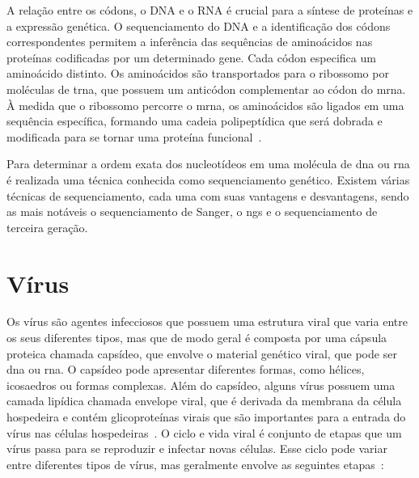 A relação entre os códons, o DNA e o RNA é crucial para a síntese de proteínas e a expressão genética. O sequenciamento do DNA e a identificação dos códons correspondentes permitem a inferência das sequências de aminoácidos nas proteínas codificadas por um determinado gene.
Cada códon especifica um aminoácido distinto. Os aminoácidos são transportados para o ribossomo por moléculas de \gls{trna}, que possuem um anticódon complementar ao códon do \gls{mrna}. À medida que o ribossomo percorre o \gls{mrna}, os aminoácidos são ligados em uma sequência específica, formando uma cadeia polipeptídica que será dobrada e modificada para se tornar uma proteína funcional~\cite{alberts_biologia_2017}.

Para determinar a ordem exata dos nucleotídeos em uma molécula de \gls{dna} ou \gls{rna} é realizada uma técnica conhecida como sequenciamento genético. Existem várias técnicas de sequenciamento, cada uma com suas vantagens e desvantagens, sendo as mais notáveis o sequenciamento de Sanger, o \gls{ngs} e o sequenciamento de terceira geração.~\cite{nanopore_sequence_jain_2016,dna_sequence_sanger_1977,next_generation_sequence_goodwin_2016}

\section{Vírus}

Os vírus são agentes infecciosos que possuem uma estrutura viral que varia entre os seus diferentes tipos, mas que de modo geral é composta por uma cápsula proteica chamada capsídeo, que envolve o material genético viral, que pode ser \gls{dna} ou \gls{rna}. O capsídeo pode apresentar diferentes formas, como hélices, icosaedros ou formas complexas. Além do capsídeo, alguns vírus possuem uma camada lipídica chamada envelope viral, que é derivada da membrana da célula hospedeira e contém glicoproteínas virais que são importantes para a entrada do vírus nas células hospedeiras~\cite{david_virology_2022}.
O ciclo e vida viral é conjunto de etapas que um vírus passa para se reproduzir e infectar novas células. Esse ciclo pode variar entre diferentes tipos de vírus, mas geralmente envolve as seguintes etapas~\cite{alberts_molecular_2002}:

